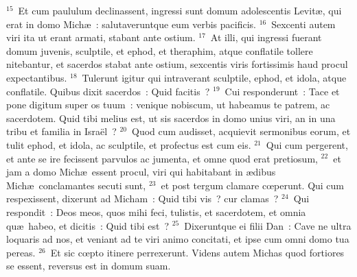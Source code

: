 ${}^{15}$~Et cum paululum declinassent, ingressi sunt domum adolescentis Levit\ae , qui erat in domo Mich\ae~: salutaveruntque eum verbis pacificis.
${}^{16}$~Sexcenti autem viri ita ut erant armati, stabant ante ostium.
${}^{17}$~At illi, qui ingressi fuerant domum juvenis, sculptile, et ephod, et theraphim, atque conflatile tollere nitebantur, et sacerdos stabat ante ostium, sexcentis viris fortissimis haud procul expectantibus.
${}^{18}$~Tulerunt igitur qui intraverant sculptile, ephod, et idola, atque conflatile. Quibus dixit sacerdos~: Quid facitis~?
${}^{19}$~Cui responderunt~: Tace et pone digitum super os tuum~: venique nobiscum, ut habeamus te patrem, ac sacerdotem. Quid tibi melius est, ut sis sacerdos in domo unius viri, an in una tribu et familia in Isra\"el~?
${}^{20}$~Quod cum audisset, acquievit sermonibus eorum, et tulit ephod, et idola, ac sculptile, et profectus est cum eis.
${}^{21}$~Qui cum pergerent, et ante se ire fecissent parvulos ac jumenta, et omne quod erat pretiosum,
${}^{22}$~et jam a domo Mich\ae\ essent procul, viri qui habitabant in \ae dibus Mich\ae\ conclamantes secuti sunt,
${}^{23}$~et post tergum clamare cœperunt. Qui cum respexissent, dixerunt ad Micham~: Quid tibi vis~? cur clamas~?
${}^{24}$~Qui respondit~: Deos meos, quos mihi feci, tulistis, et sacerdotem, et omnia qu\ae\ habeo, et dicitis~: Quid tibi est~?
${}^{25}$~Dixeruntque ei filii Dan~: Cave ne ultra loquaris ad nos, et veniant ad te viri animo concitati, et ipse cum omni domo tua pereas.
${}^{26}$~Et sic cœpto itinere perrexerunt. Videns autem Michas quod fortiores se essent, reversus est in domum suam.


